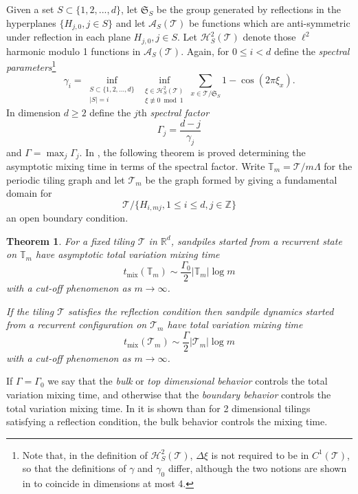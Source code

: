 \documentclass[a4paper, 12pt, notitlepage]{amsart}
\newcommand{\mix}{\operatorname{mix}}
\newcommand{\bR}{\mathbb{R}}
\newcommand{\bT}{\mathbb{T}}
\newcommand{\zed}{\mathbb{Z}}
\newcommand{\sA}{\mathscr{A}}
\newcommand{\sH}{\mathscr{H}}
\newcommand{\sT}{\mathscr{T}}
\newcommand{\fS}{{\mathfrak{S}}}
\newtheorem*{theorem*}{Theorem}
\theoremstyle{remark}
\begin{document}
Given a set $S \subset \{1, 2, ..., d\}$, let $\fS_S$ be the group generated by reflections in the hyperplanes $\{H_{j,0}, j \in S\}$ and let $\sA_S(\sT)$ be functions which are anti-symmetric under reflection in each plane $H_{j,0}, j \in S$.
Let $\sH_S^2(\sT)$ denote those $\ell^2$ harmonic modulo 1 functions in $\sA_S(\sT)$.  Again, for $0 \leq i < d$ define the \emph{spectral parameters}\footnote{Note that, in the definition of $\sH_S^2(\sT)$, $\Delta \xi$ is not required to be in $C^1(\sT)$, so that the definitions of $\gamma$ and $\gamma_0$ differ, although the two notions are shown in \cite{HS19} to coincide in dimensions at most 4.}
\begin{equation}
 \gamma_i =  \inf_{\substack{S \subset \{1, 2, ..., d\}\\ |S| = i}} \inf_{\substack{\xi \in \sH_S^2(\sT)\\ \xi \not \equiv 0 \bmod 1}} \sum_{x \in \sT/\fS_S} 1- \cos(2\pi \xi_x).
\end{equation}
In dimension $d \geq 2$ define the $j$th \emph{spectral factor} 
\begin{equation}
 \Gamma_j = \frac{d-j}{\gamma_j}
\end{equation}
and $\Gamma = \max_j \Gamma_j$.
In \cite{HS19}, the following theorem is proved determining the asymptotic mixing time in terms of the spectral factor. Write $\bT_m = \sT/m\Lambda$ for the periodic tiling graph and let $\sT_m$ be the graph formed by giving a fundamental domain for \[\sT/\{ H_{i,mj}, 1 \leq i \leq d, j \in \zed\}\] an open boundary condition.
\begin{theorem*}
For a fixed tiling $\sT$ in $\bR^d$, sandpiles started from a recurrent state on $\bT_m$ have asymptotic total variation mixing time
\begin{equation}
 t_{\mix}(\bT_m) \sim \frac{\Gamma_0}{2} |\bT_m| \log m
\end{equation}
with a cut-off phenomenon as $m \to \infty$.

If the tiling $\sT$ satisfies the reflection condition then sandpile dynamics started from a recurrent configuration on $\sT_m$ have total variation mixing time
\begin{equation}
 t_{\mix}(\sT_m) \sim \frac{\Gamma}{2} |\sT_m| \log m
\end{equation}
with a cut-off phenomenon as $m \to \infty$. 
\end{theorem*}
If $\Gamma = \Gamma_0$  we say that the \emph{bulk} or \emph{top dimensional behavior}  controls the total variation mixing time, and otherwise that the \emph{boundary behavior} controls the total variation mixing time.  In \cite{HS19} it is shown than for 2 dimensional tilings satisfying a reflection condition, the bulk behavior controls the mixing time.
\end{document}
